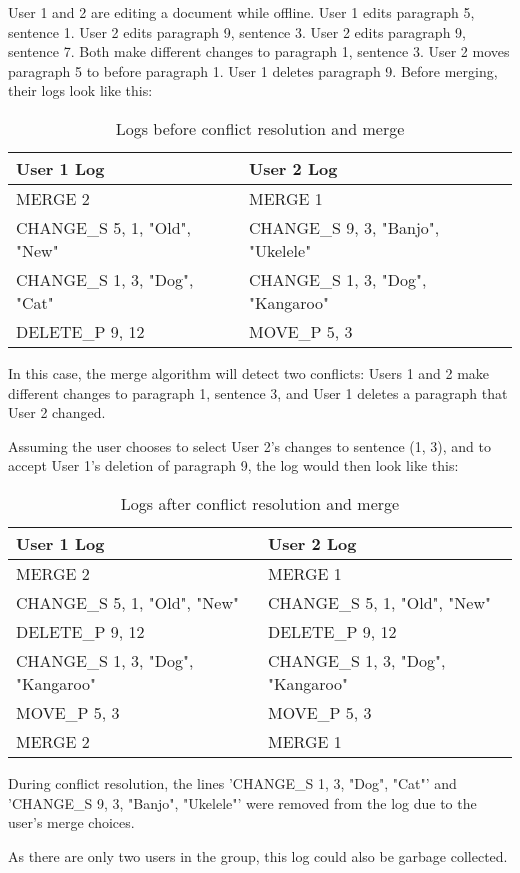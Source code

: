 User 1 and 2 are editing a document while offline. 
User 1 edits paragraph 5, sentence 1. 
User 2 edits paragraph 9, sentence 3. 
User 2 edits paragraph 9, sentence 7.
Both make different changes to paragraph 1, sentence 3. 
User 2 moves paragraph 5 to before paragraph 1. 
User 1 deletes paragraph 9. 
Before merging, their logs look like this:

\begin{table}[h!]
\begin{center}
 \begin{tabular} {|p{7cm}|p{7cm}|}
  \hline
   User 1 Log & User 2 Log \\
  \hline \hline
   MERGE 2 & MERGE 1 \\
   CHANGE\_S 5, 1, "Old", "New" & CHANGE\_S 9, 3, "Banjo", "Ukelele" \\
   CHANGE\_S 1, 3, "Dog", "Cat" & CHANGE\_S 1, 3, "Dog", "Kangaroo" \\
   DELETE\_P 9, 12 & MOVE\_P 5, 3 \\
  \hline 
 \end{tabular}
\end{center}
\caption{Logs before conflict resolution and merge}
\label{table:ex1_before}
\end{table}

In this case, the merge algorithm will detect two conflicts: Users 1 and 2 make different
changes to paragraph 1, sentence 3, and User 1 deletes a paragraph that User 2 changed.

Assuming the user chooses to select User 2's changes to sentence (1, 3), and to accept
User 1's deletion of paragraph 9, the log would then look like this:

\begin{table}[h!]
\begin{center}
 \begin{tabular} {|p{7cm}|p{7cm}|}
  \hline
   User 1 Log & User 2 Log \\
  \hline \hline
   MERGE 2 & MERGE 1 \\
   CHANGE\_S 5, 1, "Old", "New" & CHANGE\_S 5, 1, "Old", "New" \\
   DELETE\_P 9, 12 & DELETE\_P 9, 12 \\
   CHANGE\_S 1, 3, "Dog", "Kangaroo" & CHANGE\_S 1, 3, "Dog", "Kangaroo" \\
   MOVE\_P 5, 3 & MOVE\_P 5, 3 \\  
   MERGE 2 & MERGE 1 \\
  \hline
 \end{tabular}
\end{center}
\caption{Logs after conflict resolution and merge}
\label{table:ex1_after}
\end{table}

During conflict resolution, the lines 'CHANGE\_S 1, 3, "Dog", "Cat"' and 
'CHANGE\_S 9, 3, "Banjo", "Ukelele"' were removed from the log due to the user's
merge choices.

As there are only two users in the group, this log could also be garbage collected.




